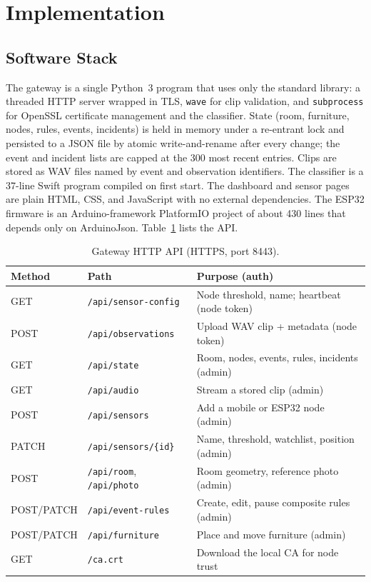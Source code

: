 \documentclass[conference]{IEEEtran}
\begin{document}
\section{Implementation}
\label{sec:impl}

\subsection{Software Stack}
The gateway is a single Python~3 program that uses only the standard library: a threaded HTTP server wrapped in TLS, \texttt{wave} for clip validation, and \texttt{subprocess} for OpenSSL certificate management and the classifier. State (room, furniture, nodes, rules, events, incidents) is held in memory under a re-entrant lock and persisted to a JSON file by atomic write-and-rename after every change; the event and incident lists are capped at the 300 most recent entries. Clips are stored as WAV files named by event and observation identifiers. The classifier is a 37-line Swift program compiled on first start. The dashboard and sensor pages are plain HTML, CSS, and JavaScript with no external dependencies. The ESP32 firmware is an Arduino-framework PlatformIO project of about 430 lines that depends only on ArduinoJson. Table~\ref{tab:api} lists the API.

\begin{table}[!t]
\centering
\caption{Gateway HTTP API (HTTPS, port 8443).}
\label{tab:api}
\renewcommand{\arraystretch}{1.1}
\footnotesize
\setlength{\tabcolsep}{3pt}
\begin{tabular}{@{}l l p{3.3cm}@{}}
\toprule
\textbf{Method} & \textbf{Path} & \textbf{Purpose (auth)} \\
\midrule
GET & \texttt{/api/sensor-config} & Node threshold, name; heartbeat (node token) \\
POST & \texttt{/api/observations} & Upload WAV clip + metadata (node token) \\
GET & \texttt{/api/state} & Room, nodes, events, rules, incidents (admin) \\
GET & \texttt{/api/audio} & Stream a stored clip (admin) \\
POST & \texttt{/api/sensors} & Add a mobile or ESP32 node (admin) \\
PATCH & \texttt{/api/sensors/\{id\}} & Name, threshold, watchlist, position (admin) \\
POST & \texttt{/api/room}, \texttt{/api/photo} & Room geometry, reference photo (admin) \\
POST/PATCH & \texttt{/api/event-rules} & Create, edit, pause composite rules (admin) \\
POST/PATCH & \texttt{/api/furniture} & Place and move furniture (admin) \\
GET & \texttt{/ca.crt} & Download the local CA for node trust \\
\bottomrule
\end{tabular}
\end{table}
\end{document}

